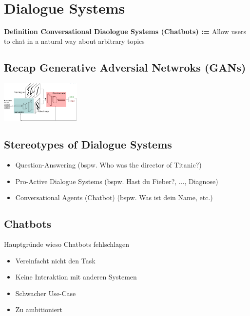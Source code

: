 \documentclass{article}
\newenvironment{Figure}
	{\par\medskip\noindent\minipage{\linewidth}}
	{\endminipage\par\medskip}
\theoremstyle{merke}
\theoremstyle{definition}
\begin{document}
    \section{Dialogue Systems}
    \textbf{Definition Conversational Diaologue Systems (Chatbots) :=} Allow users to chat in a natural way about arbitrary topics

	    \subsection{Recap Generative Adversial Netwroks (GANs)}
        \begin{Figure}
        \centering
        \includegraphics[width=150px]{img/GAN.png}
            \label{fig:Abbildung eines GANs}
        \end{Figure}

	    \subsection{Stereotypes of Dialogue Systems}
        \begin{itemize}
            \item Question-Answering (bspw. Who was the director of Titanic?)
            \item Pro-Active Dialogue Systems (bspw. Hast du Fieber?, ..., Diagnose)
            \item Conversational Agents (Chatbot) (bspw. Was ist dein Name, etc.)
        \end{itemize}

	    \subsection{Chatbots}
        Hauptgründe wieso Chatbots fehlschlagen
        \begin{itemize}
            \item Vereinfacht nicht den Task
            \item Keine Interaktion mit anderen Systemen
            \item Schwacher Use-Case
            \item Zu ambitioniert
        \end{itemize}
\end{document}
